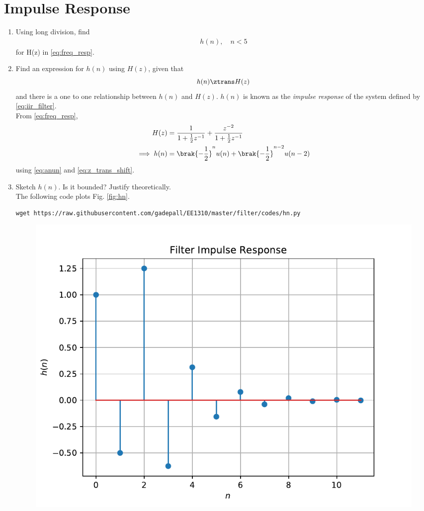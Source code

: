 \documentclass[journal,12pt,twocolumn]{IEEEtran}
\renewcommand\thesection{\arabic{section}}
\begin{document}
\section{Impulse Response}
\begin{enumerate}[label=\thesection.\arabic*]
	\item Using long division, 
find
		\begin{align}
			h(n), \quad n < 5
		\end{align}
		for H(z) in 
		\eqref{eq:freq_resp}.
\item \label{prob:impulse_resp}
Find an expression for $h(n)$ using $H(z)$, given that 
\begin{equation}
\label{eq:impulse_resp}
h(n) \ztrans H(z)
\end{equation}
and there is a one to one relationship between $h(n)$ and $H(z)$. $h(n)$ is known as the {\em impulse response} of the
system defined by \eqref{eq:iir_filter}.
\\
\solution From \eqref{eq:freq_resp},
\begin{align}
H(z) &= \frac{1}{1 + \frac{1}{2}z^{-1}} + \frac{ z^{-2}}{1 + \frac{1}{2}z^{-1}}
\\
\implies h(n) &= \brak{-\frac{1}{2}}^{n}u(n) + \brak{-\frac{1}{2}}^{n-2}u(n-2)
\end{align}
using \eqref{eq:anun} and \eqref{eq:z_trans_shift}.
\item Sketch $h(n)$. Is it bounded? Justify theoretically.
\\
\solution The following code plots Fig. \ref{fig:hn}.
\begin{lstlisting}
wget https://raw.githubusercontent.com/gadepall/EE1310/master/filter/codes/hn.py
\end{lstlisting}
\begin{figure}[!ht]
\centering
\includegraphics[width=\columnwidth]{./figs/hn}

\end{figure}
\end{enumerate}
\end{document}
